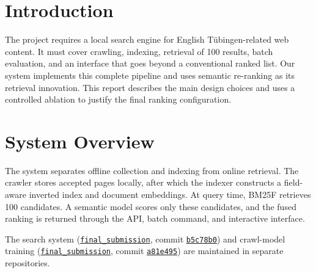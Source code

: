 \documentclass{article}
\begin{document}

\begin{abstract}
We present an end-to-end search engine for English web content related to
Tübingen. The system combines a resumable focused crawler, a self-implemented
BM25F first stage, semantic second-stage re-ranking, batch retrieval, and an
interactive result interface. In a diagnostic 20-query ablation, semantic
re-ranking outperforms BM25F and the evaluated proximity bonus does not improve
effectiveness. After configuration was frozen, re-ranking improved nDCG@10
from 0.4867 to 0.5300 on a separate 10-query test set.
\end{abstract}

\section{Introduction}
The project requires a local search engine for English Tübingen-related web
content. It must cover crawling, indexing, retrieval of 100 results, batch
evaluation, and an interface that goes beyond a conventional ranked list. Our
system implements this complete pipeline and uses semantic re-ranking as its
retrieval innovation. This report describes the main design choices and uses a
controlled ablation to justify the final ranking configuration.

\section{System Overview}
The system separates offline collection and indexing from online retrieval.
The crawler stores accepted pages locally, after which the indexer constructs a
field-aware inverted index and document embeddings. At query time, BM25F
retrieves 100 candidates. A semantic model scores only these candidates, and
the fused ranking is returned through the API, batch command, and interactive
interface.

The search system
(\href{https://github.com/julilili42/search-engine/tree/final_submission}{\texttt{final\_submission}},
commit \href{https://github.com/julilili42/search-engine/commit/b5c78b0a12f56074c9d62badfb9c9812f7e24767}{\texttt{b5c78b0}}) and crawl-model training
(\href{https://github.com/julilili42/labeling-lab/tree/final_submission}{\texttt{final\_submission}},
commit \href{https://github.com/julilili42/labeling-lab/commit/a81e4957cf8ebe00183c47a51650002ee6dc1386}{\texttt{a81e495}}) are maintained in separate repositories.
\end{document}
